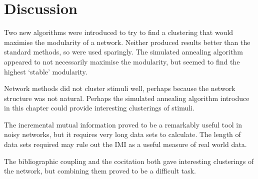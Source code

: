 %


\section{Discussion}
Two new algorithms were introduced to try to find a clustering that would maximise the modularity of a network. Neither produced results better than the standard methods, so were used sparingly.  The simulated annealing algorithm appeared to not necessarily maximise the modularity, but seemed to find the highest \lq{}stable\rq{} modularity. 

Network methods did not cluster stimuli well, perhaps because the network structure was not natural.  Perhaps the simulated annealing algorithm introduce in this chapter could provide interesting clusterings of stimuli.

The incremental mutual information proved to be a remarkably useful tool in noisy networks, but it requires very long data sets to calculate.  The length of data sets required may rule out the IMI as a useful measure of real world data.

The bibliographic coupling and  the cocitation both gave interesting clusterings of the network, but combining them proved to be a difficult task.
